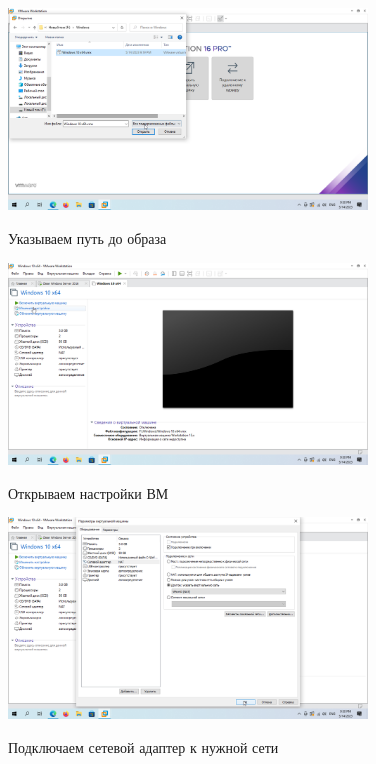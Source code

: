 \documentclass[a4paper]{article}
\begin{document}
  \begin{figure}[H]
    \centering
    \includegraphics[width=0.85\textwidth]{5_0055}
    \label{img:55}
    \caption{Указываем путь до образа}
  \end{figure}

  \begin{figure}[H]
    \centering
    \includegraphics[width=0.85\textwidth]{5_0056}
    \label{img:56}
    \caption{Открываем настройки ВМ}
  \end{figure}

  \begin{figure}[H]
    \centering
    \includegraphics[width=0.85\textwidth]{5_0057}
    \label{img:57}
    \caption{Подключаем сетевой адаптер к нужной сети}
  \end{figure}
\end{document}
